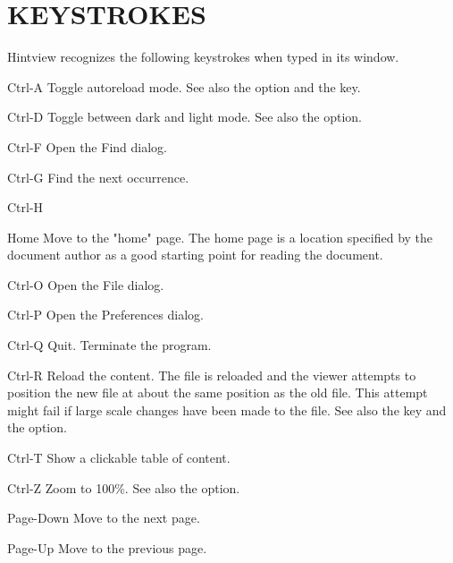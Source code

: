 \enditemize

\section{KEYSTROKES}
       Hintview recognizes the following keystrokes when typed in its window.

\itemize
\item{Ctrl-A} Toggle autoreload mode. See also the  option  and  the  
              key.

\item{Ctrl-D} Toggle between dark and light mode. See also the  option.

\item{Ctrl-F} Open the Find dialog.

\item{Ctrl-G} Find the next occurrence.

\item{Ctrl-H}\item{Home}
              Move to the "home" page. The home page is a  location  specified
              by  the document author as a good starting point for reading the
              document.
  
\item{Ctrl-O} Open the File dialog.

\item{Ctrl-P} Open the Preferences dialog.
  
\item{Ctrl-Q} Quit. Terminate the program.

\item{Ctrl-R} Reload the content. The file is reloaded and the viewer attempts
              to position the new file at about the same position as  the  old
              file.  This  attempt might fail if large scale changes have been
              made to the file. See also the  key and the  option.

\item{Ctrl-T} Show a clickable table of content.

\item{Ctrl-Z} Zoom to 100\%. See also the  option.


\item{Page-Down}
              Move to the next page.

\item{Page-Up}
              Move to the previous page.

